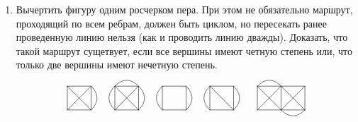 \begin{enumerate}
    \item Вычертить фигуру одним росчерком пера. При этом не обязательно маршрут, проходящий по всем ребрам, должен быть циклом, но пересекать ранее проведенную линию нельзя (как и проводить линию дважды). Доказать, что такой маршрут сущетвует, если все вершины имеют четную степень или, что только две вершины имеют нечетную степень.
    \[
        \begin{tabular}{ccccccccc}
            {\xymatrix{
                *{} \ar@{-}[r] \ar@{-}[dr] \ar@{-}[d]
                    &*{} \ar@{-}[d] \ar@{-}[dl] \ar@{-}@/^/[d]
                        \\
                *{} \ar@{-}[r]
                    &*{}                    
            }}
            &
            &
            {\xymatrix{
                *{} \ar@{-}[r] \ar@{-}@/^/[r] \ar@{-}@/_/[d] \ar@{-}[dr] \ar@{-}[d]
                    &*{} \ar@{-}[d] \ar@{-}[dl] \ar@{-}@/^/[d]
                        \\
                *{} \ar@{-}[r]
                    &*{}                    
            }}
            &
            &
            {\xymatrix{
                *{} \ar@{-}[r] \ar@{-}@/_/[d] \ar@{-}[d]
                    &*{} \ar@{-}[d] \ar@{-}@/^/[d]
                        \\
                *{} \ar@{-}[r]
                    &*{}                    
            }}
            &
            &
            {\xymatrix{
                *{} \ar@{-}[r] \ar@{-}@/_/[d] \ar@{-}[dr] \ar@{-}[d]
                    &*{} \ar@{-}[d] \ar@{-}@/^/[d]
                        \\
                *{} \ar@{-}[r]
                    &*{}                    
            }}
            &
            &
            {\xymatrix{
                *{} \ar@{-}[r] \ar@{-}@/^/[r] \ar@{-}[d] \ar@{-}[dr]
                    &*{} \ar@{-}[r] \ar@{-}[d] \ar@{-}[dr] \ar@{-}[dl]
                        &*{} \ar@{-}[d] \ar@{-}[dl]
                            \\
                *{} \ar@{-}[r]
                    &*{} \ar@{-}[r] \ar@{-}@/_/[r]
                        &*{} 
            }}
        \end{tabular}
    \]
    

\end{enumerate}
